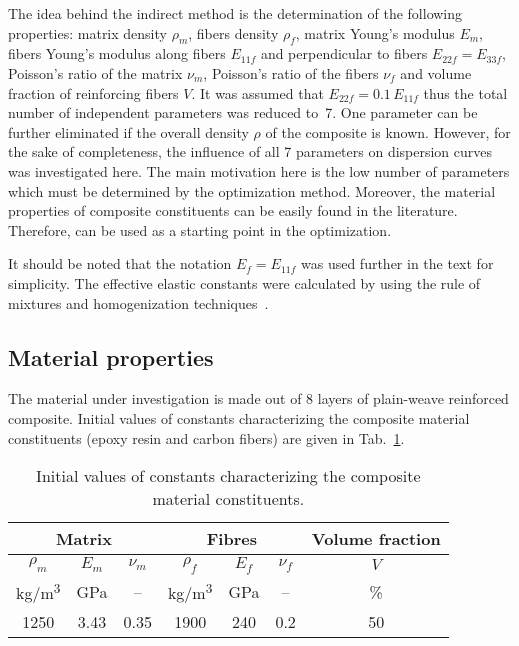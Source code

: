 \documentclass[]{spie}  %
\begin{document}
The idea behind the indirect method is the determination of the following properties: matrix density  \(\rho_m\), fibers density \(\rho_f\), matrix Young's modulus \(E_m\), fibers Young's modulus along fibers \(E_{11f}\) and perpendicular to fibers \(E_{22f}=E_{33f}\), Poisson's ratio of the matrix \(\nu_m\), Poisson's ratio of the fibers \(\nu_f\) and volume fraction of reinforcing fibers \(V\). 
It was assumed that \(E_{22f} = 0.1\, E_{11f}\) thus the total number of independent parameters was reduced to~7. 
One parameter can be further eliminated if the overall density \(\rho\) of the composite is known. 
However, for the sake of completeness, the influence of all 7 parameters on dispersion curves was investigated here. 
The main motivation here is the low number of parameters which must be determined by the optimization method. 
Moreover, the material properties of composite constituents can be easily found in the literature. 
Therefore, can be used as a starting point in the optimization. 

It should be noted that the notation \(E_f = E_{11f}\) was used further in the text for simplicity. 
The effective elastic constants were calculated by using the rule of mixtures and homogenization techniques~\cite{Barbero2006a,Adumitroaie2012}.

\subsection{Material properties}
The material under investigation is made out of 8 layers of plain-weave reinforced composite. 
Initial values of constants characterizing the composite material constituents (epoxy resin and carbon fibers) are given in Tab.~\ref{tab:matprop}.
\begin{table}[ht]
	\renewcommand{\arraystretch}{1.3}
	\caption{Initial values of constants characterizing the composite material 
		constituents.}
	\label{tab:matprop}
	\begin{center}	
		\begin{tabular}{ccccccc} 
			\toprule
			\multicolumn{3}{c}{\textbf{Matrix} }	& \multicolumn{3}{c}{\textbf{Fibres} } & 
			\textbf{Volume fraction}	 \\ 
			\midrule
			\(\rho_m\) & \(E_m\) & \(\nu_m\)  & \(\rho_f\) & \(E_f\) & \(\nu_f\) & \(V\)\\
			kg/m\textsuperscript{3} &GPa& --  & kg/m\textsuperscript{3}  & GPa& -- & \%\\ 
			\cmidrule(lr){1-3} \cmidrule(lr){4-6} \cmidrule(lr){7-7}
			1250 &3.43& 0.35& 1900 & 240 & 0.2 & 50\\
			\bottomrule 
		\end{tabular} 
	\end{center}
\end{table}
\end{document}

